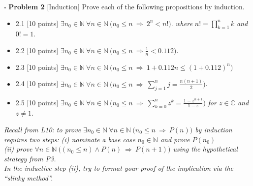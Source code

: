 \documentclass[11pt]{article}
\numberwithin{equation}{section}
\DeclareMathOperator*{\+}{\oplus}
\begin{document}
   \newpage
    \noindent $\square$ \textbf{Problem 2}  [\textsf{Induction}] Prove each of the following propositions by induction.
      \begin{itemize} 
   \itemsep0em 
  \item 2.1 [10 points] $ \exists n_0 \in \mathbb{N} \  \forall n \in \mathbb{N} \ \Big (n_0 \leq n \ \Rightarrow \ 2^n < n! \Big )$. \textit{where $n! = \prod\limits_{k=1}^n k$ and $0!=1$}.
 \item 2.2 [10 points] $ \exists n_0 \in \mathbb{N} \ \forall n \in \mathbb{N} \ \Big (n_0 \leq n \ \Rightarrow \frac{1}{n} < 0.112 \Big )$.
 \item 2.3 [10 points] $\exists n_0 \in \mathbb{N} \ \forall n \in \mathbb{N} \ \Big (n_0 \leq n \ \Rightarrow \ 1+0.112n \leq (1+ 0.112)^n \Big )$
  \item 2.4 [10 points] $\exists n_0 \in \mathbb{N} \ \forall n \in \mathbb{N} \ \Big (n_0 \leq n \ \Rightarrow \ \sum\limits_{j=1}^n j= \frac{n(n+1)}{2} \Big )$.
  \item 2.5 [10 points] $\exists n_0 \in \mathbb{N} \ \forall n \in \mathbb{N} \ \Big (n_0 \leq n \ \Rightarrow \ \sum\limits_{k=0}^n z^k = \frac{1-z^{n+1}}{1-z} \Big )$ \textit{for $z \in \mathbb{C}$ and $z \neq 1$}.
   \end{itemize}
  {\small 
  \noindent \textit{Recall from \textnormal{\textsf{L10}}: to prove $\exists n_0 \in \mathbb{N} \ \forall n \in \mathbb{N} \ \Big ( n_0 \leq n \ \Rightarrow \ P(n) \Big )$ by induction requires two steps:
  \indent \textnormal{(i)} nominate a base case $n_0 \in \mathbb{N}$ and prove $P(n_0)$\\
  \indent \textnormal{(ii)} prove $\forall n \in \mathbb{N} \ \Big ( (n_0 \leq n)  \land P(n) \ \Rightarrow \ P(n+1) \Big )$ using the hypothetical strategy from \textnormal{\textsf{P3}}.\\ 
In the inductive step \textnormal{(ii)}, try to format your proof of the implication via the ``slinky method''.}}
\end{document}
